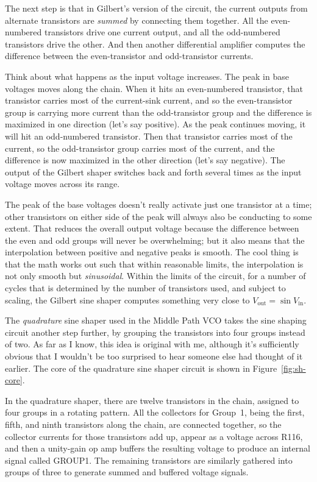 The next step is that in Gilbert's version of the circuit, the current
outputs from alternate transistors are \emph{summed} by connecting them
together.  All the even-numbered transistors drive one current output, and
all the odd-numbered transistors drive the other.  And then another
differential amplifier computes the difference between the even-transistor
and odd-transistor currents.

Think about what happens as the input voltage increases.  The peak in base
voltages moves along the chain.  When it hits an even-numbered transistor,
that transistor carries most of the current-sink current, and so the
even-transistor group is carrying more current than the odd-transistor
group and the difference is maximized in one direction (let's say positive). 
As the peak continues moving, it will hit an odd-numbered transistor.  Then
that transistor carries most of the current, so the odd-transistor group
carries most of the current, and the difference is now maximized in the
other direction (let's say negative).  The output of the Gilbert shaper
switches back and forth several times as the input voltage moves across its
range.

The peak of the base voltages doesn't really activate just one transistor at
a time; other transistors on either side of the peak will always also be
conducting to some extent.  That reduces the overall output voltage because
the difference between the even and odd groups will never be overwhelming;
but it also means that the interpolation between positive and negative peaks
is smooth.  The cool thing is that the math works out such that within
reasonable limits, the interpolation is not only smooth but
\emph{sinusoidal}.  Within the limits of the circuit, for a number of cycles
that is determined by the number of transistors used, and subject to
scaling, the Gilbert sine shaper computes something very close to
$V_\textrm{out} = \sin V_\textrm{in}$.

The \emph{quadrature} sine shaper used in the Middle Path VCO takes the sine
shaping circuit another step further, by grouping the transistors into four
groups instead of two.  As far as I know, this idea is original with me,
although it's sufficiently obvious that I wouldn't be too surprised to hear
someone else had thought of it earlier.  The core of the quadrature sine
shaper circuit is shown in Figure~\ref{fig:sh-core}.

In the quadrature shaper, there are twelve transistors in the chain,
assigned to four groups in a rotating pattern.  All the collectors for
Group~1, being the first, fifth, and ninth transistors along the chain, are
connected together, so the collector currents for those transistors add up,
appear as a voltage across R116, and then a unity-gain op amp buffers the
resulting voltage to produce an internal signal called GROUP1.  The
remaining transistors are similarly gathered into groups of three to
generate summed and buffered voltage signals.

